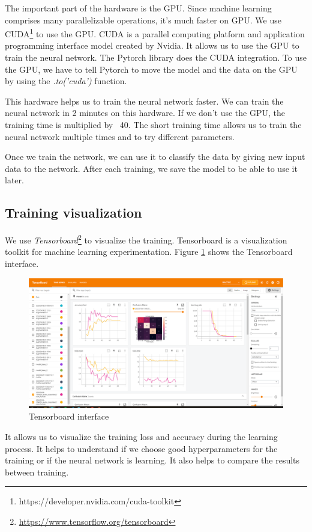 The important part of the hardware is the GPU. Since machine learning comprises many parallelizable operations, it's much faster on GPU. We use CUDA\footnote{https://developer.nvidia.com/cuda-toolkit} to use the GPU. CUDA is a parallel computing platform and application programming interface model created by Nvidia. It allows us to use the GPU to train the neural network. The Pytorch library does the CUDA integration. To use the GPU, we have to tell Pytorch to move the model and the data on the GPU by using the \textit{.to('cuda')} function.

This hardware helps us to train the neural network faster. We can train the neural network in 2 minutes on this hardware. If we don't use the GPU, the training time is multiplied by ~40. The short training time allows us to train the neural network multiple times and to try different parameters.

Once we train the network, we can use it to classify the data by giving new input data to the network. After each training, we save the model to be able to use it later.

\subsection{Training visualization}

We use \textit{Tensorboard}\footnote{\url{https://www.tensorflow.org/tensorboard}} to visualize the training. Tensorboard is a visualization toolkit for machine learning experimentation. Figure \ref{fig:tensorboard} shows the Tensorboard interface.

\begin{figure}[H]
    \centering
    \includegraphics[width=.8\textwidth]{images/tensorboard.png}
    \caption{Tensorboard interface}
    \label{fig:tensorboard}
\end{figure}

It allows us to visualize the training loss and accuracy during the learning process. It helps to understand if we choose good hyperparameters for the training or if the neural network is learning. It also helps to compare the results between training. 

